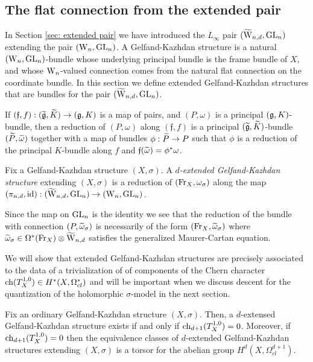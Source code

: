 
\subsection{The flat connection from the extended pair}

In Section \ref{sec: extended pair} we have introduced the $L_\infty$ pair $(\TVectd, \GL_n)$ extending the pair $(\Vect, \GL_n)$.
A Gelfand-Kazhdan structure is a natural $(\Vect,\GL_n)$-bundle whose underlying principal bundle is the frame bundle of $X$, and whose $\Vect$-valued connection comes from the natural flat connection on the coordinate bundle. 
In this section we define extended Gelfand-Kazhdan structures that are bundles for the pair $(\TVectd,\GL_n)$.

If $(\mathfrak{f},f) : (\Tilde{\fg},\Tilde{K}) \to (\fg, K)$ is a map of pairs, and $(P,\omega)$ is a principal $(\fg,K)$-bundle, then a reduction of $(P,\omega)$ along $(\mathfrak{f},f)$ is a principal $(\Tilde{\fg}, \Tilde{K})$-bundle $(\Tilde{P}, \Tilde{\omega})$ together with a map of bundles $\phi : \Tilde{P} \to P$ such that $\phi$ is a reduction of the principal $K$-bundle along $f$ and $\mathfrak{f}(\Tilde{\omega}) = \phi^*\omega$.

\begin{dfn}
Fix a Gelfand-Kazhdan structure $(X,\sigma)$.  
A {\em $d$-extended Gelfand-Kazhdan structure} extending $(X,\sigma)$ is a reduction of $(\Fr_X, \omega_{\sigma})$ along the map $(\pi_{n,d}, {\rm id}) : (\TVectd,\GL_n) \to (\Vect, \GL_n)$.
\end{dfn}

Since the map on $\GL_n$ is the identity we see that the reduction of the bundle with connection $(P, \Tilde{\omega}_\sigma)$ is necessarily of the form $(\Fr_X, \Tilde{\omega}_\sigma)$ where $\Tilde{\omega}_\sigma \in \Omega^*(\Fr_X) \tensor \TVectd$ satisfies the generalized Maurer-Cartan equation.

We will show that extended Gelfand-Kazhdan structures are precisely associated to the data of a trivialization of of components of the Chern character $\ch(T_X^{1,0}) \in H^*(X, \Omega^*_{cl})$ and will be important when we discuss descent for the quantization of the holomorphic $\sigma$-model in the next section.

\begin{prop}\label{prop: extended GK}
Fix an ordinary Gelfand-Kazhdan structure $(X,\sigma)$.
Then, a $d$-extensed Gelfand-Kazhdan structure exists if and only if $\ch_{d+1}(T^{1,0}_X) = 0$.
Moreover, if $\ch_{d+1}(T_X^{1,0}) = 0$ then the equivalence classes of $d$-extended Gelfand-Kazhdan structures extending $(X,\sigma)$ is a torsor for the abelian group $H^{d}(X , \Omega^{d+1}_{cl})$.
\end{prop}

